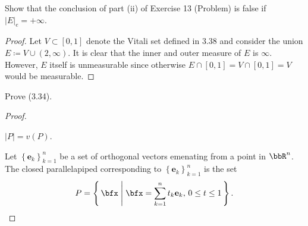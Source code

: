 \begin{problem}
Show that the conclusion of part  (ii) of Exercise 13 (Problem) is false if
$\left|E\right|_e=+\infty$.
\end{problem}
\begin{proof}
Let $V\subset[0,1]$ denote the Vitali set defined in 3.38 and consider the
union $E\coloneqq V\cup(2,\infty)$. It is clear that the inner and outer
measure of $E$ is $\infty$. However, $E$ itself is unmeasurable since
otherwise $E\cap[0,1]=V\cap[0,1]=V$ would be measurable.
\end{proof}
\newpage

\begin{problem}
Prove (3.34).
\end{problem}
\begin{proof}
\begin{lemma*}
$\left|P\right|=v(P)$.
\end{lemma*}
Let $\left\{\mathbf{e}_k\right\}_{k=1}^n$ be a set of orthogonal vectors
emenating from a point in $\bbR^n$. The closed parallelapiped corresponding
to $\left\{\mathbf{e}_k\right\}_{k=1}^n$ is the set
\begin{equation}
\label{eq:closed-parallelapiped}
P=
\left\{\,\bfx\;\middle|\;
\text{$\bfx=\sum_{k=1}^nt_k\mathbf{e}_k$, $0\leq t\leq 1$}\,\right\}.
\end{equation}

\end{proof}
\newpage

